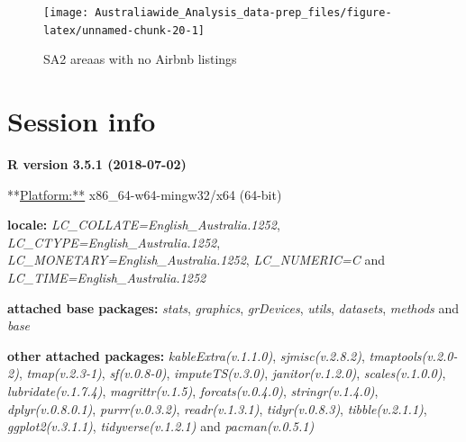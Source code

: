\documentclass[]{article}
\begin{document}
\begin{figure}[H]

{\centering \texttt{[image: Australiawide\_Analysis\_data-prep\_files/figure-latex/unnamed-chunk-20-1]} 

}

\caption{SA2 areaas with no Airbnb listings}\label{fig:unnamed-chunk-20}
\end{figure}

\newpage

\section{Session info}\label{session-info}

\textbf{R version 3.5.1 (2018-07-02)}

**\url{Platform:**} x86\_64-w64-mingw32/x64 (64-bit)

\textbf{locale:} \emph{LC\_COLLATE=English\_Australia.1252},
\emph{LC\_CTYPE=English\_Australia.1252},
\emph{LC\_MONETARY=English\_Australia.1252}, \emph{LC\_NUMERIC=C} and
\emph{LC\_TIME=English\_Australia.1252}

\textbf{attached base packages:} \emph{stats}, \emph{graphics},
\emph{grDevices}, \emph{utils}, \emph{datasets}, \emph{methods} and
\emph{base}

\textbf{other attached packages:} \emph{kableExtra(v.1.1.0)},
\emph{sjmisc(v.2.8.2)}, \emph{tmaptools(v.2.0-2)}, \emph{tmap(v.2.3-1)},
\emph{sf(v.0.8-0)}, \emph{imputeTS(v.3.0)}, \emph{janitor(v.1.2.0)},
\emph{scales(v.1.0.0)}, \emph{lubridate(v.1.7.4)},
\emph{magrittr(v.1.5)}, \emph{forcats(v.0.4.0)},
\emph{stringr(v.1.4.0)}, \emph{dplyr(v.0.8.0.1)}, \emph{purrr(v.0.3.2)},
\emph{readr(v.1.3.1)}, \emph{tidyr(v.0.8.3)}, \emph{tibble(v.2.1.1)},
\emph{ggplot2(v.3.1.1)}, \emph{tidyverse(v.1.2.1)} and
\emph{pacman(v.0.5.1)}
\end{document}

